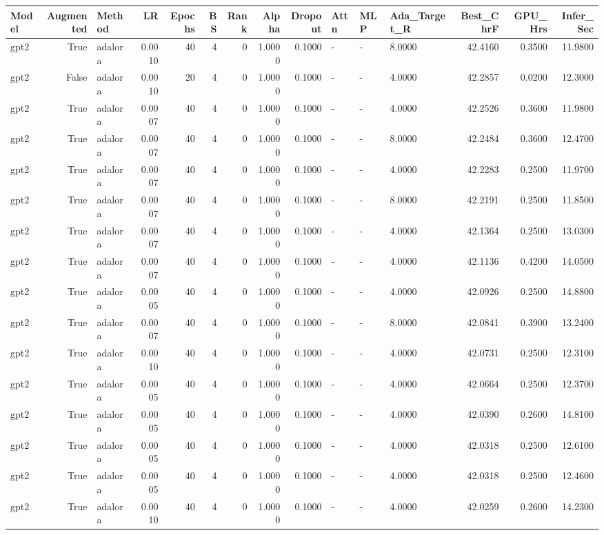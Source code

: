 \begin{tabular}{lrlrrrrrrlllrrr}
\toprule
Model & Augmented & Method & LR & Epochs & BS & Rank & Alpha & Dropout & Attn & MLP & Ada_Target_R & Best_ChrF & GPU_Hrs & Infer_Sec \\
\midrule
gpt2 & True & adalora & 0.0010 & 40 & 4 & 0 & 1.0000 & 0.1000 & - & - & 8.0000 & 42.4160 & 0.3500 & 11.9800 \\
gpt2 & False & adalora & 0.0010 & 20 & 4 & 0 & 1.0000 & 0.1000 & - & - & 4.0000 & 42.2857 & 0.0200 & 12.3000 \\
gpt2 & True & adalora & 0.0007 & 40 & 4 & 0 & 1.0000 & 0.1000 & - & - & 4.0000 & 42.2526 & 0.3600 & 11.9800 \\
gpt2 & True & adalora & 0.0007 & 40 & 4 & 0 & 1.0000 & 0.1000 & - & - & 8.0000 & 42.2484 & 0.3600 & 12.4700 \\
gpt2 & True & adalora & 0.0007 & 40 & 4 & 0 & 1.0000 & 0.1000 & - & - & 4.0000 & 42.2283 & 0.2500 & 11.9700 \\
gpt2 & True & adalora & 0.0007 & 40 & 4 & 0 & 1.0000 & 0.1000 & - & - & 8.0000 & 42.2191 & 0.2500 & 11.8500 \\
gpt2 & True & adalora & 0.0007 & 40 & 4 & 0 & 1.0000 & 0.1000 & - & - & 4.0000 & 42.1364 & 0.2500 & 13.0300 \\
gpt2 & True & adalora & 0.0007 & 40 & 4 & 0 & 1.0000 & 0.1000 & - & - & 4.0000 & 42.1136 & 0.4200 & 14.0500 \\
gpt2 & True & adalora & 0.0005 & 40 & 4 & 0 & 1.0000 & 0.1000 & - & - & 4.0000 & 42.0926 & 0.2500 & 14.8800 \\
gpt2 & True & adalora & 0.0007 & 40 & 4 & 0 & 1.0000 & 0.1000 & - & - & 8.0000 & 42.0841 & 0.3900 & 13.2400 \\
gpt2 & True & adalora & 0.0010 & 40 & 4 & 0 & 1.0000 & 0.1000 & - & - & 4.0000 & 42.0731 & 0.2500 & 12.3100 \\
gpt2 & True & adalora & 0.0005 & 40 & 4 & 0 & 1.0000 & 0.1000 & - & - & 4.0000 & 42.0664 & 0.2500 & 12.3700 \\
gpt2 & True & adalora & 0.0005 & 40 & 4 & 0 & 1.0000 & 0.1000 & - & - & 4.0000 & 42.0390 & 0.2600 & 14.8100 \\
gpt2 & True & adalora & 0.0005 & 40 & 4 & 0 & 1.0000 & 0.1000 & - & - & 4.0000 & 42.0318 & 0.2500 & 12.6100 \\
gpt2 & True & adalora & 0.0005 & 40 & 4 & 0 & 1.0000 & 0.1000 & - & - & 4.0000 & 42.0318 & 0.2500 & 12.4600 \\
gpt2 & True & adalora & 0.0010 & 40 & 4 & 0 & 1.0000 & 0.1000 & - & - & 4.0000 & 42.0259 & 0.2600 & 14.2300 \\

\end{tabular}
